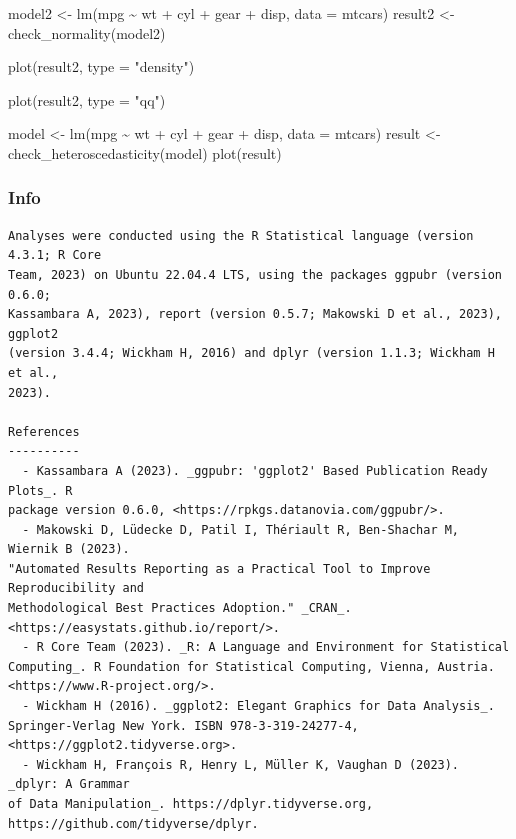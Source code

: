 \documentclass[
]{article}
\newenvironment{Shaded}{\begin{snugshade}}{\end{snugshade}}
\newcommand{\AttributeTok}[1]{\textcolor[rgb]{0.40,0.45,0.13}{#1}}
\newcommand{\FunctionTok}[1]{\textcolor[rgb]{0.28,0.35,0.67}{#1}}
\newcommand{\NormalTok}[1]{\textcolor[rgb]{0.00,0.23,0.31}{#1}}
\newcommand{\OtherTok}[1]{\textcolor[rgb]{0.00,0.23,0.31}{#1}}
\newcommand{\SpecialCharTok}[1]{\textcolor[rgb]{0.37,0.37,0.37}{#1}}
\newcommand{\StringTok}[1]{\textcolor[rgb]{0.13,0.47,0.30}{#1}}
\begin{document}
\begin{Shaded}
\begin{Highlighting}[]
\NormalTok{model2 }\OtherTok{\textless{}{-}} \FunctionTok{lm}\NormalTok{(mpg }\SpecialCharTok{\textasciitilde{}}\NormalTok{ wt }\SpecialCharTok{+}\NormalTok{ cyl }\SpecialCharTok{+}\NormalTok{ gear }\SpecialCharTok{+}\NormalTok{ disp, }\AttributeTok{data =}\NormalTok{ mtcars)}
\NormalTok{result2 }\OtherTok{\textless{}{-}} \FunctionTok{check\_normality}\NormalTok{(model2)}

\FunctionTok{plot}\NormalTok{(result2, }\AttributeTok{type =} \StringTok{"density"}\NormalTok{)}

\FunctionTok{plot}\NormalTok{(result2, }\AttributeTok{type =} \StringTok{"qq"}\NormalTok{)}

\NormalTok{model }\OtherTok{\textless{}{-}} \FunctionTok{lm}\NormalTok{(mpg }\SpecialCharTok{\textasciitilde{}}\NormalTok{ wt }\SpecialCharTok{+}\NormalTok{ cyl }\SpecialCharTok{+}\NormalTok{ gear }\SpecialCharTok{+}\NormalTok{ disp, }\AttributeTok{data =}\NormalTok{ mtcars)}
\NormalTok{result }\OtherTok{\textless{}{-}} \FunctionTok{check\_heteroscedasticity}\NormalTok{(model)}
\FunctionTok{plot}\NormalTok{(result)}
\end{Highlighting}
\end{Shaded}

\subsubsection{Info}\label{info}

\begin{verbatim}
Analyses were conducted using the R Statistical language (version 4.3.1; R Core
Team, 2023) on Ubuntu 22.04.4 LTS, using the packages ggpubr (version 0.6.0;
Kassambara A, 2023), report (version 0.5.7; Makowski D et al., 2023), ggplot2
(version 3.4.4; Wickham H, 2016) and dplyr (version 1.1.3; Wickham H et al.,
2023).

References
----------
  - Kassambara A (2023). _ggpubr: 'ggplot2' Based Publication Ready Plots_. R
package version 0.6.0, <https://rpkgs.datanovia.com/ggpubr/>.
  - Makowski D, Lüdecke D, Patil I, Thériault R, Ben-Shachar M, Wiernik B (2023).
"Automated Results Reporting as a Practical Tool to Improve Reproducibility and
Methodological Best Practices Adoption." _CRAN_.
<https://easystats.github.io/report/>.
  - R Core Team (2023). _R: A Language and Environment for Statistical
Computing_. R Foundation for Statistical Computing, Vienna, Austria.
<https://www.R-project.org/>.
  - Wickham H (2016). _ggplot2: Elegant Graphics for Data Analysis_.
Springer-Verlag New York. ISBN 978-3-319-24277-4,
<https://ggplot2.tidyverse.org>.
  - Wickham H, François R, Henry L, Müller K, Vaughan D (2023). _dplyr: A Grammar
of Data Manipulation_. https://dplyr.tidyverse.org,
https://github.com/tidyverse/dplyr.
\end{verbatim}
\end{document}
